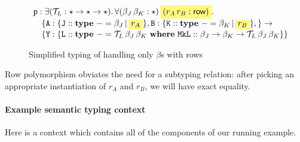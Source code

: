 \documentclass{article}
\begin{document}
\begin{figure}[H]
\[
\begin{array}{l}
\cidl{p} : \exists (\CT_L : \star \rightarrow \star \rightarrow \star).\, \forall (\beta_J\, \beta_K : \star)\, \highlight{(r_A\, r_B : \row)}.\, \\
    \quad \{
     \modname{A} :
        \{ \mathtt{J} :: \mathbf{type}~{-} = \beta_J \,|\, \highlight{r_A} \},
     \modname{B} :
        \{ \mathtt{K} :: \mathbf{type}~{-} = \beta_K \,|\, \highlight{r_B} \},
    \}
    \rightarrow \\
    \quad \{
     \modname{Y} :
        \{ \mathtt{L} :: \mathbf{type}~{-} = \CT_L\, \beta_J\, \beta_K~\mathbf{where}~\mathtt{MkL} :: \beta_J \rightarrow \beta_K \rightarrow \CT_L\, \beta_J\, \beta_K \}
    \}
\end{array}
\]
\caption{Simplified typing of  handling only $\beta$s with rows}
\end{figure}

\noindent
Row polymorphism obviates the need for a subtyping relation:
after picking an appropriate instantiation of $r_A$ and $r_B$,
we will have exact equality.

\paragraph{Example semantic typing context}
Here is a context which contains all of the components of our running example.
\end{document}
